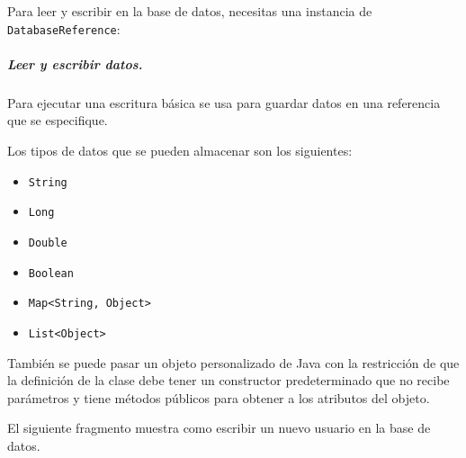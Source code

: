 %

Para leer y escribir en la base de datos, necesitas una instancia de
\texttt{DatabaseReference}:

%
\begin{sphinxVerbatim}[commandchars=\\\{\}]
  
  
\end{sphinxVerbatim}


\subparagraph{Leer y escribir datos.}
\label{\detokenize{dev_docs:leer-y-escribir-datos}}
Para ejecutar una escritura básica se usa  para guardar datos en
una referencia que se especifique.

Los tipos de datos que se pueden almacenar son los siguientes:
\begin{itemize}
\item {}
\texttt{String}

\item {}
\texttt{Long}

\item {}
\texttt{Double}

\item {}
\texttt{Boolean}

\item {}
\texttt{Map\textless{}String, Object\textgreater{}}

\item {}
\texttt{List\textless{}Object\textgreater{}}

\end{itemize}

También se puede pasar un objeto personalizado de Java con la restricción
de que la definición de la clase debe tener un constructor predeterminado
que no recibe parámetros y tiene métodos públicos para obtener a los atributos
del objeto.

El siguiente fragmento muestra como escribir un nuevo usuario en la base de
datos.

%
\begin{sphinxVerbatim}[commandchars=\\\{\}]
      
    
\end{sphinxVerbatim}



